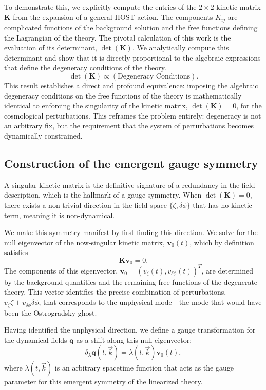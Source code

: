 \documentclass[twocolumn]{aastex631}
\begin{document}
To demonstrate this, we explicitly compute the entries of the $2 \times 2$ kinetic matrix $\mathbf{K}$ from the expansion of a general HOST action. The components $K_{ij}$ are complicated functions of the background solution and the free functions defining the Lagrangian of the theory. The pivotal calculation of this work is the evaluation of its determinant, $\det(\mathbf{K})$. We analytically compute this determinant and show that it is directly proportional to the algebraic expressions that define the degeneracy conditions of the theory.
\begin{equation}
\det(\mathbf{K}) \propto (\text{Degeneracy Conditions}).
\end{equation}
This result establishes a direct and profound equivalence: imposing the algebraic degeneracy conditions on the free functions of the theory is mathematically identical to enforcing the singularity of the kinetic matrix, $\det(\mathbf{K}) = 0$, for the cosmological perturbations. This reframes the problem entirely: degeneracy is not an arbitrary fix, but the requirement that the system of perturbations becomes dynamically constrained.

\subsection{Construction of the emergent gauge symmetry}
A singular kinetic matrix is the definitive signature of a redundancy in the field description, which is the hallmark of a gauge symmetry. When $\det(\mathbf{K})=0$, there exists a non-trivial direction in the field space $\{\zeta, \delta\phi\}$ that has no kinetic term, meaning it is non-dynamical.

We make this symmetry manifest by first finding this direction. We solve for the null eigenvector of the now-singular kinetic matrix, $\mathbf{v}_0(t)$, which by definition satisfies
\begin{equation}
\mathbf{K} \mathbf{v}_0 = 0.
\end{equation}
The components of this eigenvector, $\mathbf{v}_0 = (v_\zeta(t), v_{\delta\phi}(t))^T$, are determined by the background quantities and the remaining free functions of the degenerate theory. This vector identifies the precise combination of perturbations, $v_\zeta \zeta + v_{\delta\phi} \delta\phi$, that corresponds to the unphysical mode---the mode that would have been the Ostrogradsky ghost.

Having identified the unphysical direction, we define a gauge transformation for the dynamical fields $\mathbf{q}$ as a shift along this null eigenvector:
\begin{equation}
\delta_\lambda \mathbf{q}(t, \vec{k}) = \lambda(t, \vec{k}) \mathbf{v}_0(t),
\end{equation}
where $\lambda(t, \vec{k})$ is an arbitrary spacetime function that acts as the gauge parameter for this emergent symmetry of the linearized theory.
\end{document}
